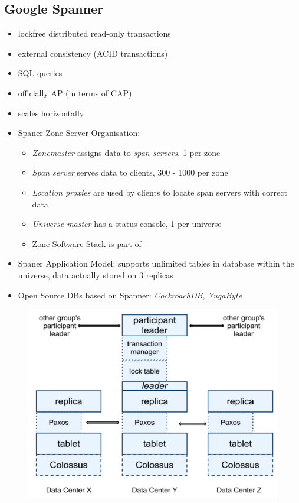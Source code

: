 \documentclass[a4paper]{article}
\begin{document}
\begin{multicols}{3}
\subsection{Google Spanner}
\begin{itemize}
    \item lockfree distributed read-only transactions
    \item external consistency (ACID transactions)
    \item SQL queries
    \item officially AP (in terms of CAP)
    \item scales horizontally
    \item Spaner Zone Server Organisation:
        \begin{itemize}
            \item \textit{Zonemaster} assigns data to \textit{span servers}, 1 per zone
            \item \textit{Span server} serves data to clients, 300 - 1000 per zone
            \item \textit{Location proxies} are used by clients to locate span servers with correct data
            \item \textit{Universe master} has a status console, 1 per universe
            \item Zone Software Stack is part of 
        \end{itemize}
    \item Spaner Application Model: supports unlimited tables in database within the universe, data actually stored on 3 replicas
    \item Open Source DBs based on Spanner: \textit{CockroachDB}, \textit{YugaByte}
\end{itemize}

\begin{figure}[H]
    \includegraphics[width=\linewidth]{ZoneSoftwareStack.png}
    \label{fig:zonesoftwarestack}
\end{figure}


\end{multicols}
\end{document}
